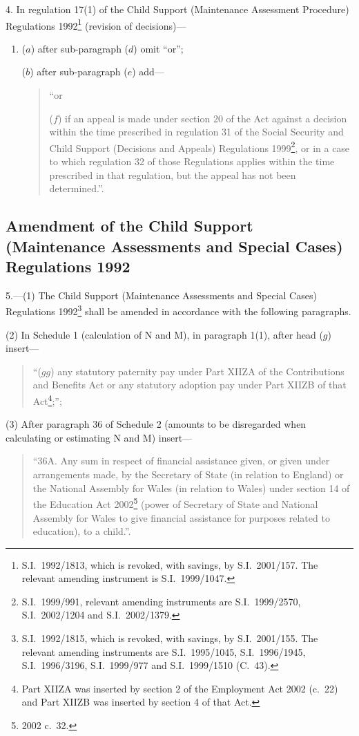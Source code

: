 \documentclass[12pt,a4paper]{article}
\begin{document}
4.  In regulation 17(1) of the Child Support (Maintenance Assessment Procedure) Regulations 1992\footnote{S.I.\ 1992/1813, which is revoked, with savings, by S.I.\ 2001/157. The relevant amending instrument is S.I.\ 1999/1047.} (revision of decisions)—
\begin{enumerate}\item[]
($a$) after sub-paragraph ($d$)  omit “or”;

($b$) after sub-paragraph ($e$)  add—
\begin{quotation}
    “or

    ($f$) 
    if an appeal is made under section 20 of the Act against a decision within the time prescribed in regulation 31 of the Social Security and Child Support (Decisions and Appeals) Regulations 1999\footnote{S.I.\ 1999/991, relevant amending instruments are S.I.\ 1999/2570, S.I.\ 2002/1204 and S.I.\ 2002/1379.}, or in a case to which regulation 32 of those Regulations applies within the time prescribed in that regulation, but the appeal has not been determined.”. 
\end{quotation}
\end{enumerate}

\subsection[5. Amendment of the Child Support (Maintenance Assessments and Special Cases) Regulations 1992]{Amendment of the Child Support (Maintenance Assessments and Special Cases) Regulations 1992}

5.---(1)  The Child Support (Maintenance Assessments and Special Cases) Regulations 1992\footnote{S.I.\ 1992/1815, which is revoked, with savings, by S.I.\ 2001/155. The relevant amending instruments are S.I.\ 1995/1045, S.I.\ 1996/1945, S.I.\ 1996/3196, S.I.\ 1999/977 and S.I.\ 1999/1510 (C.\ 43).} shall be amended in accordance with the following paragraphs.

(2) In Schedule 1 (calculation of N and M), in paragraph 1(1), after head ($g$)  insert—
\begin{quotation}
“($gg$) any statutory paternity pay under Part XIIZA of the Contributions and Benefits Act or any statutory adoption pay under Part XIIZB of that Act\footnote{Part XIIZA was inserted by section 2 of the Employment Act 2002 (c.\ 22) and Part XIIZB was inserted by section 4 of that Act.};”;
\end{quotation}

(3) After paragraph 36 of Schedule 2 (amounts to be disregarded when calculating or estimating N and M) insert—
\begin{quotation}
“36A.  Any sum in respect of financial assistance given, or given under arrangements made, by the Secretary of State (in relation to England) or the National Assembly for Wales (in relation to Wales) under section 14 of the Education Act 2002\footnote{2002 c.\ 32.} (power of Secretary of State and National Assembly for Wales to give financial assistance for purposes related to education), to a child.”.
\end{quotation}
\end{document}
